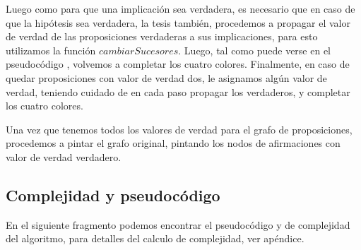 Luego como para que una implicación sea verdadera, es necesario que en caso de que la hipótesis sea verdadera, la tesis también, procedemos a propagar el valor de verdad de las proposiciones verdaderas a sus implicaciones, para esto utilizamos la función $ cambiarSucesores $. Luego, tal como puede verse en el pseudocódigo , volvemos a completar los cuatro colores. Finalmente, en caso de quedar proposiciones con valor de verdad dos, le asignamos algún valor de verdad, teniendo cuidado de en cada paso propagar los verdaderos, y completar los cuatro colores.

Una vez que tenemos todos los valores de verdad para el grafo de proposiciones, procedemos a pintar el grafo original, pintando los nodos de afirmaciones con valor de verdad verdadero.

\subsection{Complejidad y pseudocódigo}
En el siguiente fragmento podemos encontrar el pseudocódigo y de complejidad del algoritmo, para detalles del calculo de complejidad, ver apéndice.

